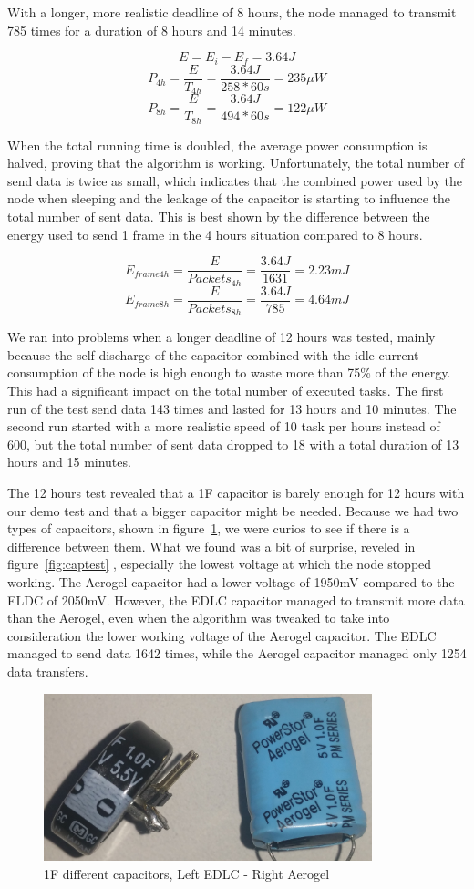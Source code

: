 With a longer, more realistic deadline of 8 hours, the node managed to transmit 785 times for a
duration of 8 hours and 14 minutes.

$$E = E_i - E_f = 3.64J$$
$$P_{4h} = \frac{E}{T_{4h}} = \frac{3.64J}{258 * 60s} = 235{\mu}W $$
$$P_{8h} = \frac{E}{T_{8h}} = \frac{3.64J}{494 * 60s} = 122{\mu}W $$

When the total running time is doubled, the average power consumption is halved, proving that the
algorithm is working. Unfortunately, the total number of send data is twice as small, which indicates that the
combined power used by the node when sleeping and the leakage of the capacitor is starting to
influence the total number of sent data. This is best shown by the difference between the energy
used to send 1 frame in the 4 hours situation compared to 8 hours.

$$E_{frame4h} = \frac{E}{Packets_{4h}} = \frac{3.64J}{1631} =2.23mJ $$
$$E_{frame8h} = \frac{E}{Packets_{8h}} = \frac{3.64J}{785} = 4.64mJ $$

We ran into problems when a longer deadline of 12 hours was tested, mainly because the self
discharge of the capacitor combined with the idle current
consumption of the node is high enough to waste more than 75\% of the energy. This had a significant
impact on the total number of executed tasks. The first run of the test send data 143 times and
lasted for 13 hours and 10 minutes. The second run started with a more realistic speed of 10 task
per hours instead of 600, but the total number of sent data dropped to 18 with a total duration of
13 hours and 15 minutes.

The 12 hours test revealed that a 1F capacitor is barely enough for 12 hours with our demo test and that
a bigger capacitor might be needed. Because we had two types of capacitors, shown in
figure~\ref{fig:twocap}, we were curios to
see if there is a difference between them. What we found was a bit of surprise, reveled in
figure~\ref{fig:captest} , especially the
lowest voltage at which the node stopped working. The Aerogel capacitor had a lower voltage of 1950mV
compared to the ELDC of 2050mV. However, the EDLC capacitor managed to transmit more data than
the Aerogel, even when the algorithm was tweaked to take into consideration the lower working
voltage of the Aerogel capacitor. The EDLC managed to send data 1642 times, while the Aerogel
capacitor managed only 1254 data transfers.

\begin{figure}[ht] \centering
\includegraphics[width=0.85\textwidth]{img/capacitors.jpg}
\caption{1F different capacitors, Left EDLC - Right Aerogel}
\label{fig:twocap}
\end{figure}

